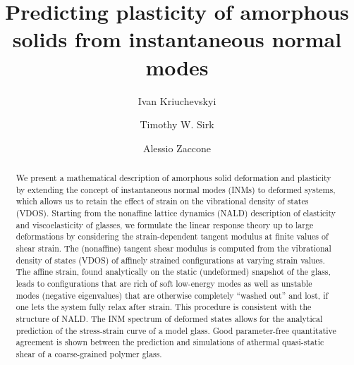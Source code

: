 \documentclass[pre,twocolumn,aps,superscriptaddress,showpacs]{revtex4-1}
\begin{document}
\title{Predicting
plasticity of amorphous solids from instantaneous normal
modes}

\author{Ivan Kriuchevskyi}


\author{Timothy W. Sirk}

\author{Alessio Zaccone}


\begin{abstract}
We present a mathematical description of amorphous solid deformation and plasticity by extending the concept of instantaneous normal modes (INMs) to deformed systems, which allows us to retain the effect of strain on the vibrational density of states (VDOS).
Starting from the nonaffine lattice dynamics (NALD) description of elasticity and viscoelasticity of glasses, we formulate the linear response theory up to large deformations by considering the strain-dependent tangent modulus at finite values of shear strain. 
The (nonaffine) tangent shear modulus is computed from the vibrational density of states (VDOS) of affinely strained configurations at varying strain values. The affine strain, found analytically on the static (undeformed) snapshot of the glass, leads to configurations that are rich of soft low-energy modes as well as unstable modes (negative eigenvalues) that are otherwise completely ``washed out'' and lost, if one lets the system fully relax after strain. This procedure is consistent with the structure of NALD.
The INM spectrum of deformed states allows for the analytical prediction of the stress-strain curve of a model glass. Good parameter-free quantitative agreement is shown between the prediction and simulations of athermal quasi-static shear of a coarse-grained polymer glass.
\end{abstract}

 \maketitle

\newpage

\end{document}

